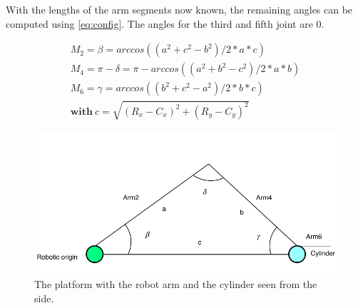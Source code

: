 With the lengths of the arm segments now known, the remaining angles can be computed using \autoref{eq:config}.
The angles for the third and fifth joint are $0$.

\begin{equation}
\label{eq:config}
\begin{aligned}
M_2=\beta=arccos((a^2+c^2-b^2)/2*a*c)\\
M_4=\pi-\delta=\pi-arccos((a^2+b^2-c^2)/2*a*b)\\
M_6=\gamma=arccos((b^2+c^2-a^2)/2*b*c)\\
\textbf{with}\ c=\sqrt{(R_x-C_x)^2+(R_y-C_y)^2}
\end{aligned}
\end{equation}

\begin{figure}[tpb]
\centering
	\includegraphics[width=0.96\linewidth]{figures/right_v.pdf} 
	\caption{The platform with the robot arm and the cylinder seen from the side.}
	\vspace{-0.4cm}
	\label{fig:right}
\end{figure}



